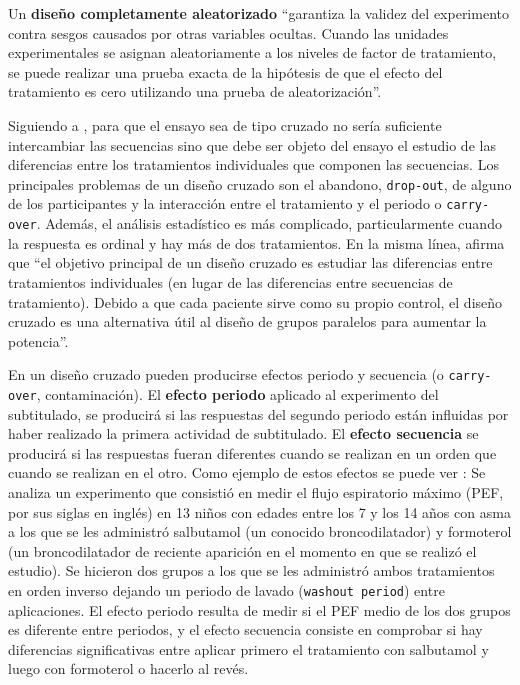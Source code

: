 \documentclass[
  12pt,
  a4paper,
  extrafontsizes,
  onecolumn,
  openright,
  table]{memoir}
\begin{document}
Un \textbf{\gls{diseño completamente aleatorizado}}
\autocite[pp.~18]{lawson2015} \enquote{garantiza la validez del
experimento contra sesgos causados por otras variables ocultas. Cuando
las unidades experimentales se asignan aleatoriamente a los niveles de
factor de tratamiento, se puede realizar una prueba exacta de la
hipótesis de que el efecto del tratamiento es cero utilizando una prueba
de aleatorización}.

Siguiendo a \textcite[pp.~5-9]{senn2022}, para que el ensayo sea de tipo
cruzado no sería suficiente intercambiar las secuencias sino que debe
ser objeto del ensayo el estudio de las diferencias entre los
tratamientos individuales que componen las secuencias. Los principales
problemas de un diseño cruzado son el abandono, \texttt{drop-out}, de
alguno de los participantes y la interacción entre el tratamiento y el
periodo o \texttt{carry-over}. Además, el análisis estadístico es más
complicado, particularmente cuando la respuesta es ordinal y hay más de
dos tratamientos. En la misma línea, \textcite[pp.~1-2]{lui2016} afirma
que \enquote{el objetivo principal de un diseño cruzado es estudiar las
diferencias entre tratamientos individuales (en lugar de las diferencias
entre secuencias de tratamiento). Debido a que cada paciente sirve como
su propio control, el diseño cruzado es una alternativa útil al diseño
de grupos paralelos para aumentar la potencia}.

En un diseño cruzado pueden producirse efectos periodo y secuencia (o
\texttt{carry-over}, contaminación). El \textbf{efecto periodo} aplicado
al experimento del subtitulado, se producirá si las respuestas del
segundo periodo están influidas por haber realizado la primera actividad
de subtitulado. El \textbf{efecto secuencia} se producirá si las
respuestas fueran diferentes cuando se realizan en un orden que cuando
se realizan en el otro. Como ejemplo de estos efectos se puede ver
\textcite[pp.~35-53]{senn2022}: Se analiza un experimento que consistió
en medir el flujo espiratorio máximo (PEF, por sus siglas en inglés) en
13 niños con edades entre los 7 y los 14 años con asma a los que se les
administró salbutamol (un conocido broncodilatador) y formoterol (un
broncodilatador de reciente aparición en el momento en que se realizó el
estudio). Se hicieron dos grupos a los que se les administró ambos
tratamientos en orden inverso dejando un periodo de lavado
(\texttt{washout\ period}) entre aplicaciones. El \gls{efecto periodo}
resulta de medir si el PEF medio de los dos grupos es diferente entre
periodos, y el \gls{efecto secuencia} consiste en comprobar si hay
diferencias significativas entre aplicar primero el tratamiento con
salbutamol y luego con formoterol o hacerlo al revés.
\end{document}

